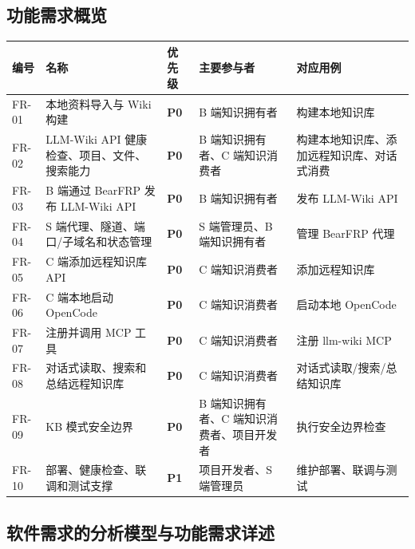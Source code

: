 \documentclass[UTF8,a4paper,12pt,fontset=fandol]{ctexart}
\newcommand{\code}[1]{\texorpdfstring{\begingroup\footnotesize\detokenize{#1}\endgroup}{#1}}
\newcommand{\priority}[1]{\textcolor{whu}{\bfseries #1}}
\begin{document}
\subsection{功能需求概览}
\begin{longtable}{>{\centering\arraybackslash}p{1.4cm}p{5.2cm}>{\centering\arraybackslash}p{1.3cm}p{3.2cm}p{3.0cm}}
\toprule
编号 & 名称 & 优先级 & 主要参与者 & 对应用例 \\
\midrule
FR-01 & 本地资料导入与 Wiki 构建 & \priority{P0} & B 端知识拥有者 & 构建本地知识库 \\
FR-02 & LLM-Wiki API 健康检查、项目、文件、搜索能力 & \priority{P0} & B 端知识拥有者、C 端知识消费者 & 构建本地知识库、添加远程知识库、对话式消费 \\
FR-03 & B 端通过 BearFRP 发布 LLM-Wiki API & \priority{P0} & B 端知识拥有者 & 发布 LLM-Wiki API \\
FR-04 & S 端代理、隧道、端口/子域名和状态管理 & \priority{P0} & S 端管理员、B 端知识拥有者 & 管理 BearFRP 代理 \\
FR-05 & C 端添加远程知识库 API & \priority{P0} & C 端知识消费者 & 添加远程知识库 \\
FR-06 & C 端本地启动 OpenCode & \priority{P0} & C 端知识消费者 & 启动本地 OpenCode \\
FR-07 & 注册并调用 \code{llm_wiki_*} MCP 工具 & \priority{P0} & C 端知识消费者 & 注册 llm-wiki MCP \\
FR-08 & 对话式读取、搜索和总结远程知识库 & \priority{P0} & C 端知识消费者 & 对话式读取/搜索/总结知识库 \\
FR-09 & KB 模式安全边界 & \priority{P0} & B 端知识拥有者、C 端知识消费者、项目开发者 & 执行安全边界检查 \\
FR-10 & 部署、健康检查、联调和测试支撑 & \priority{P1} & 项目开发者、S 端管理员 & 维护部署、联调与测试 \\
\bottomrule
\end{longtable}

\subsection{软件需求的分析模型与功能需求详述}
\end{document}
